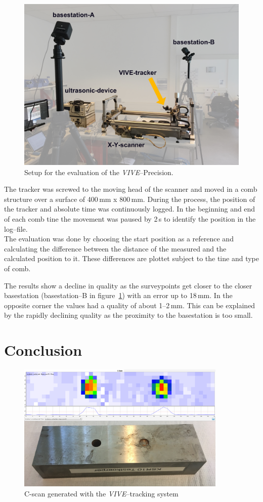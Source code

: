 \documentclass{VRARWorkshop}
\begin{document}
\begin{figure}[h!]
    \begin{center}
        \includegraphics[width=120mm]{images/PrecisionMeasurement}
        \caption{\label{fig:precisionMeasurementSetup} Setup for the evaluation of the \textit{VIVE}--Precision.}
    \end{center}
\end{figure}

The tracker was screwed to the moving head of the scanner and moved in a comb structure over a surface of 400\,mm x 800\,mm.
During the process, the position of the tracker and absolute time was continuously logged.
In the beginning and end of each comb tine the movement was paused by 2\,s to identify the position in the log--file.\\

The evaluation was done by choosing the start position as a reference and calculating the difference between the distance of the measured and the calculated position to it.
These differences are plottet subject to the tine and type of comb.

The results show a decline in quality as the surveypoints get closer to the closer basestation (basestation--B in figure~\ref{fig:precisionMeasurementSetup}) with an error up to 18\,mm.
In the opposite corner the values had a quality of about 1--2\,mm.
This can be explained by the rapidly declining quality as the proximity to the basestation is too small.

\section{Conclusion}

\begin{figure}[h!]
    \begin{center}
        \includegraphics[width=100mm]{images/CScanARUS}
        \caption{\label{fig:resultCScan} C-scan generated with the \textit{VIVE}--tracking system}
    \end{center}
\end{figure}

\VRARsetbibstyle

\end{document}
